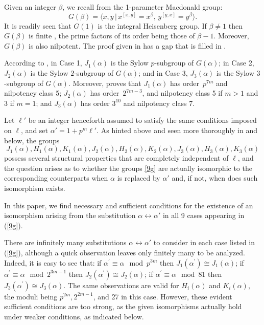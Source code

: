 \documentclass{amsart}
\theoremstyle{definition}
\theoremstyle{remark}
\begin{document}
Given an integer $\beta$, we recall from \cite{M} the 1-parameter Macdonald group:
$$
G(\beta)=\langle x,y\,|\, x^{[x,y]}=x^{\beta},\, y^{[y,x]}=y^{\beta}\rangle.
$$
It is readily seen that $G(1)$ is the integral Heisenberg group. If $\beta\neq 1$ then
$G(\beta)$ is finite \cite{M}, the prime factors of its order being those of $\beta-1$.
Moreover, $G(\beta)$ is also nilpotent. The proof given 
in \cite{M} has a gap that is filled in \cite{MS}.

According to \cite[Theorem 5.3]{MS}, in Case 1, $J_1(\alpha)$ is the Sylow $p$-subgroup of $G(\alpha)$; in Case 2,
$J_2(\alpha)$ is the Sylow $2$-subgroup of $G(\alpha)$; and in Case 3,
$J_3(\alpha)$ is the Sylow $3$-subgroup of $G(\alpha)$. Moreover, \cite[Theorem 7.1]{MS} proves that
$J_1(\alpha)$ has order~$p^{7m}$ and nilpotency class 5;
$J_2(\alpha)$ has order~$2^{7m-3}$, and nilpotency class 5 if $m>1$ and 3 if $m=1$; and
$J_3(\alpha)$ has order $3^{10}$ and nilpotency class 7.

Let $\ell'$ be an integer henceforth assumed to satisfy the same conditions imposed on $\ell$, and
set $\alpha'=1+p^m\ell'$. As hinted above and seen more thoroughly in \cite{MS} and below, the groups
\begin{equation}\label{9g}
J_1(\alpha), H_1(\alpha), K_1(\alpha),J_2(\alpha), H_2(\alpha),K_2(\alpha),J_3(\alpha),H_3(\alpha),K_3(\alpha)
\end{equation}
possess several structural properties that are completely independent of $\ell$, and the question arises
as to whether the groups \eqref{9g} are actually isomorphic to the corresponding counterparts
when $\alpha$ is replaced by $\alpha'$ and, if not, when does such isomorphism exists.

In this paper, we find necessary and sufficient conditions for the existence
of an isomorphism arising from the substitution $\alpha\leftrightarrow\alpha'$ in all 9 cases appearing in (\ref{9g}).

There are infinitely many substitutions $\alpha\leftrightarrow\alpha'$ to consider in each case listed in (\ref{9g}),
although a quick observation leaves only finitely
many to be analyzed. Indeed, it is easy to see that:
if $\alpha^\prime\equiv\alpha\mod p^{3m}$ then $J_1(\alpha^\prime)\cong J_1(\alpha)$; if
$\alpha^\prime\equiv\alpha\mod 2^{3m-1}$ then $J_2(\alpha^\prime)\cong J_2(\alpha)$; if
$\alpha^\prime\equiv\alpha\mod 81$ then $J_3(\alpha^\prime)\cong J_3(\alpha)$. The same observations
are valid for $H_i(\alpha)$ and $K_i(\alpha)$, the moduli being $p^{2m}, 2^{2m-1}$, and 27 in this case.
However, these evident sufficient conditions are too strong,
as the given isomorphisms actually hold under weaker conditions, as indicated below.
\end{document}
